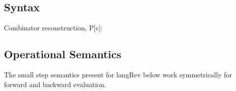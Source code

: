 \documentclass[preprint]{sigplanconf}
\begin{document}
\subsection{Syntax}

%
%
%

Combinator reconstruction, {{P[c]}}:

\subsection{Operational Semantics}

The small step semantics present for {{langRev}} below work
symmetrically for forward and backward evaluation.
\end{document}
